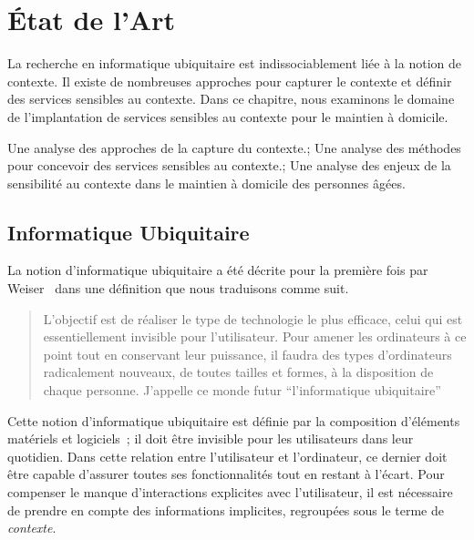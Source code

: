 \chapter{\'Etat de l'Art}
\begin{preamble}
La recherche en informatique ubiquitaire est indissociablement liée à la notion de contexte. Il existe de nombreuses approches pour capturer le contexte et définir des services sensibles au contexte. Dans ce chapitre, nous examinons le domaine de l'implantation de services sensibles au contexte pour le maintien à domicile.
\end{preamble}
{
Une analyse des approches de la capture du contexte.;
Une analyse des méthodes pour concevoir des services sensibles au contexte.;
Une analyse des enjeux de la sensibilité au contexte dans le maintien à domicile des personnes âgées.
}

\section{Informatique Ubiquitaire}

La notion d'informatique ubiquitaire a été décrite pour la première fois
par Weiser~\parencite{weiser1993some} dans une définition que nous traduisons comme suit.
\begin{quote}
L'objectif est de réaliser le type de technologie le plus efficace, celui qui 
est essentiellement invisible pour l'utilisateur. Pour amener les ordinateurs à 
ce point tout en conservant leur puissance, il faudra des types d'ordinateurs 
radicalement nouveaux, de toutes tailles et formes, à la disposition de chaque 
personne. J'appelle ce monde futur ``l'informatique ubiquitaire''
\end{quote}
Cette notion d'informatique ubiquitaire est définie par la composition 
d'éléments matériels et logiciels~; il doit être invisible pour les utilisateurs 
dans leur quotidien. Dans cette relation entre l'utilisateur et l'ordinateur, 
ce dernier doit être capable d'assurer toutes ses fonctionnalités tout en 
restant à l'écart. Pour compenser le manque d'interactions explicites avec
l'utilisateur, il est nécessaire de prendre en compte des informations
implicites, regroupées sous le terme de {\em contexte}.

